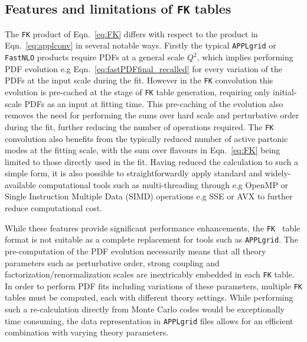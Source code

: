 \documentclass[preprint,12pt]{elsarticle}
\begin{document}
\subsection{Features and limitations of {\tt FK} tables}
The {\tt FK} product of Eqn.~\ref{eq:FK} differs with respect to the product in Eqn.~\ref{eq:applconv} in several notable ways. Firstly 
the typical {\tt APPLgrid} or {\tt FastNLO} products require PDFs at a general scale $Q^2$, which implies performing PDF evolution e.g Eqn.~\ref{eq:fastPDFfinal_recalled} for every variation of the PDFs at the input scale during the fit. However in the {\tt FK} convolution this evolution
is pre-cached at the stage of {\tt FK} table generation, requiring only initial-scale PDFs as an input at fitting time. This pre-caching of the evolution
also removes the need for performing the sums over hard scale and perturbative order during the fit, further reducing the number of operations required.
The {\tt FK} convolution also benefits from the typically reduced number of active partonic modes at the fitting scale, with the sum over flavours in Eqn.~\ref{eq:FK} being limited to those directly used in the fit. Having reduced the calculation to such a simple form, it is also possible to straightforwardly
apply standard and widely-available computational tools such as multi-threading through e.g OpenMP or Single Instruction Multiple Data (SIMD) operations e.g SSE or AVX to further reduce computational cost.

While these features provide significant performance enhancements, the {\tt FK } table format is not suitable as a complete replacement for tools
such as {\tt APPLgrid}. The pre-computation of the PDF evolution necessarily means that all theory parameters such as perturbative order, strong coupling and factorization/renormalization scales are inextricably embedded in each {\tt FK} table. In order to perform PDF fits including variations of these parameters, multiple {\tt FK } tables must be computed, each with different theory settings. While performing such a re-calculation directly from Monte Carlo codes
would be exceptionally time consuming, the data representation in {\tt APPLgrid} files allows for an efficient combination with varying theory parameters.

\end{document}
